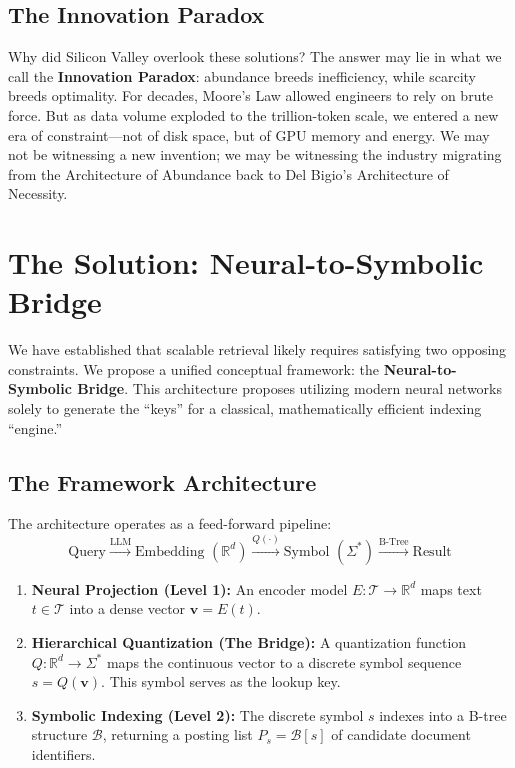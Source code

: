 \documentclass[manuscript,screen,nonacm]{acmart}
\begin{document}
\subsection{The Innovation Paradox}

Why did Silicon Valley overlook these solutions? The answer may lie in what we call the \textbf{Innovation Paradox}: abundance breeds inefficiency, while scarcity breeds optimality. For decades, Moore's Law allowed engineers to rely on brute force. But as data volume exploded to the trillion-token scale, we entered a new era of constraint---not of disk space, but of GPU memory and energy. We may not be witnessing a new invention; we may be witnessing the industry migrating from the Architecture of Abundance back to Del Bigio's Architecture of Necessity.

\section{The Solution: Neural-to-Symbolic Bridge}

We have established that scalable retrieval likely requires satisfying two opposing constraints. We propose a unified conceptual framework: the \textbf{Neural-to-Symbolic Bridge}. This architecture proposes utilizing modern neural networks solely to generate the ``keys'' for a classical, mathematically efficient indexing ``engine.''

\subsection{The Framework Architecture}

The architecture operates as a feed-forward pipeline:
\begin{equation}
\text{Query} \xrightarrow{\text{LLM}} \text{Embedding } (\mathbb{R}^d) \xrightarrow{Q(\cdot)} \text{Symbol } (\Sigma^*) \xrightarrow{\text{B-Tree}} \text{Result}
\label{eq:pipeline}
\end{equation}

\begin{enumerate}
    \item \textbf{Neural Projection (Level 1):} An encoder model $E: \mathcal{T} \to \mathbb{R}^d$ maps text $t \in \mathcal{T}$ into a dense vector $\mathbf{v} = E(t)$.
    \item \textbf{Hierarchical Quantization (The Bridge):} A quantization function $Q: \mathbb{R}^d \to \Sigma^*$ maps the continuous vector to a discrete symbol sequence $s = Q(\mathbf{v})$. This symbol serves as the lookup key.
    \item \textbf{Symbolic Indexing (Level 2):} The discrete symbol $s$ indexes into a B-tree structure $\mathcal{B}$, returning a posting list $P_s = \mathcal{B}[s]$ of candidate document identifiers.
\end{enumerate}
\end{document}
